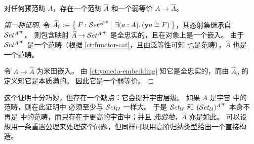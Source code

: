 %
%

\begin{thm}\label{thm:rezk-completion}
  对任何预范畴 $A$，存在一个范畴 $\widehat A$ 和一个弱等价 $A\to\widehat{A}$。
\end{thm}

\begin{proof}[第一种证明]
  令 $\widehat{A}_0 \defeq \setof{ F:\uset^{A\op} | \exis{a:A} (\y a \cong F)}$，其态射集继承自 $\mathcal{S}et^{A^{\mathrm{op}}}$。
  则包含映射 $\widehat{A} \to \mathcal{S}et^{A^{\mathrm{op}}}$ 是全忠实的，且在对象上是一个嵌入。
  由于 $\mathcal{S}et^{A^{\mathrm{op}}}$ 是一个范畴（根据 \cref{ct:functor-cat}，且由泛等性可知 \uset 也是范畴），$\widehat A$ 也是一个范畴。

  令 $A\to\widehat A$ 为米田嵌入。
  由 \cref{ct:yoneda-embedding} 知它是全忠实的，而由 $\widehat{A}_0$ 的定义知它是本质满的。
  因此它是一个弱等价。
\end{proof}

这个证明十分巧妙，但存在一个缺点：它会提升宇宙层级。
如果 $A$ 是宇宙 \bbU 中的范畴，则在此证明中 \uset 必须至少与 $\mathcal{S}et_{\mathcal{U}}$ 一样大。
于是 $\mathcal{S}et_{\mathcal{U}}$ 和 $(\mathcal{S}et_{\mathcal{U}})^{A^{\mathrm{op}}}$ 本身不再是 \bbU 中的范畴，而只存在于更高的宇宙中；并且 \emph{先验地}，$\widehat A$ 亦是如此。
可以设想用一条重置公理来处理这个问题，但同样可以用高阶归纳类型给出一个直接构造。

